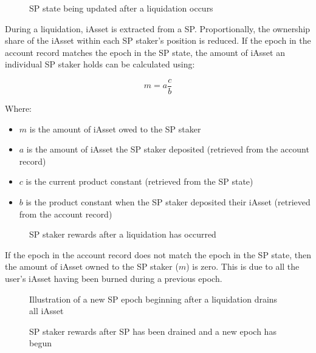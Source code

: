 \documentclass{article}
\begin{document}
\begin{sloppypar}
\hypertarget{stability-liquidation}{%
\begin{figure}[htbp]
\centering

\caption{SP state being updated after a liquidation occurs}
\label{stability-liquidation}
\end{figure}}

\filbreak

During a liquidation, iAsset is extracted from a SP. Proportionally, the
ownership share of the iAsset within each SP staker's position is
reduced. If the epoch in the account record matches the epoch in the SP
state, the amount of iAsset an individual SP staker holds can be
calculated using:

\[m = a\frac{c}{b}\]

Where:

\begin{itemize}
\item
  \(m\) is the amount of iAsset owed to the SP staker
\item
  \(a\) is the amount of iAsset the SP staker deposited (retrieved from
  the account record)
\item
  \(c\) is the current product constant (retrieved from the SP state)
\item
  \(b\) is the product constant when the SP staker deposited their
  iAsset (retrieved from the account record)
\end{itemize}

\hypertarget{stability-user-rewards}{%
\begin{figure}[htbp]
\centering

\caption{SP staker rewards after a liquidation has occurred}
\label{stability-user-rewards}
\end{figure}}

If the epoch in the account record does not match the epoch in the SP
state, then the amount of iAsset owned to the SP staker (\(m\)) is zero.
This is due to all the user's iAsset having been burned during a
previous epoch.

\hypertarget{stability-epoch}{%
\begin{figure}[htbp]
\centering

\caption{Illustration of a new SP epoch beginning after
a liquidation drains all iAsset}
\label{stability-epoch}
\end{figure}}

\hypertarget{stability-user-epoch-rewards}{%
\begin{figure}[htbp]
\centering

\caption{SP staker rewards after SP has been
drained and a new epoch has begun}
\label{stability-user-epoch-rewards}
\end{figure}}


\end{sloppypar}
\end{document}
